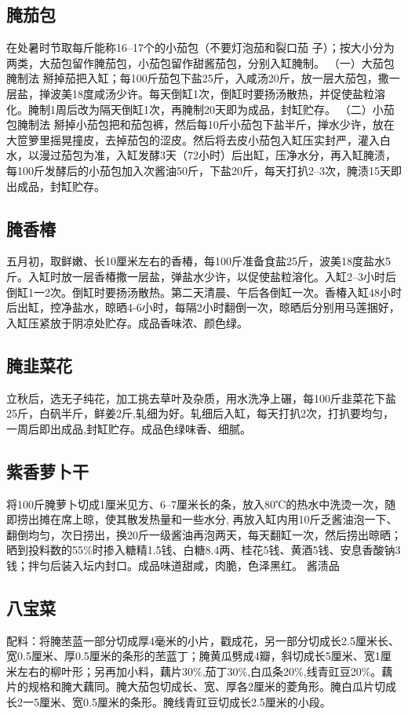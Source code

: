 \documentclass{ctexbook}
\begin{document}
\subsection{腌茄包}
在处暑时节取每斤能称16--17个的小茄包（不要灯泡茄和裂口茄
子）；按大小分为两类，大茄包留作腌茄包，小茄包留作甜酱茄包，分别入缸腌制。
（一）大茄包腌制法
掰掉茄把入缸；每100斤茄包下盐25斤，入咸汤20斤，放一层大茄包，撒一层盐，掸波美18度咸汤少许。每天倒缸1次，倒缸时要扬汤散热，并促使盐粒溶化。腌制1周后改为隔天倒缸1次，再腌制20天即为成品，封缸贮存。
（二）小茄包腌制法
掰掉小茄包把和茄包裤，然后每10斤小茄包下盐半斤，掸水少许，放在大笸箩里摇晃撞皮，去掉茄包的涩皮。然后将去皮小茄包入缸压实封严，灌入白水，以漫过茄包为准，入缸发酵3天（72小时）后出缸，压净水分，再入缸腌渍，每100斤发酵后的小茄包加入次酱油50斤，下盐20斤，每天打扒2--3次，腌渍15天即出成品，封缸贮存。
\subsection{腌香椿}
五月初，取鲜嫩、长10厘米左右的香椿，每100斤准备食盐25斤，波美18度盐水5斤。入缸时放一层香椿撒一层盐，弹盐水少许，以促使盐粒溶化。入缸2--3小时后倒缸1一2次。倒缸时要扬汤散热。第二天清晨、午后各倒缸一次。香椿入缸48小时后出缸，控净盐水，晾晒4-6小时，每隔2小时翻倒一次，晾晒后分别用马莲捆好，入缸压紧放于阴凉处贮存。成品香味浓、颜色绿。
\subsection{腌韭菜花}
立秋后，选无子纯花，加工挑去草叶及杂质，用水洗净上碾，每100斤韭菜花下盐25斤，白矾半斤，鲜姜2斤,轧细为好。轧细后入缸，每天打扒2次，打扒要均匀，一周后即出成品,封缸贮存。成品色绿味香、细腻。
\subsection{紫香萝卜干}
将100斤腌萝卜切成1厘米见方、6--7厘米长的条，放入80℃的热水中洗烫一次，随即捞出摊在席上晾，使其散发热量和一些水分,
再放入缸内用10斤乏酱油泡一下、翻倒均匀，次日捞出，换20斤一级酱油再泡两天，每天翻缸一次，然后捞出晾晒；晒到投料数的55\%时掺入糖精1.5钱、白糖8.4两、桂花5钱、黄酒5钱、安息香酸钠3钱；拌匀后装入坛内封口。成品味道甜咸，肉脆，色泽黑红。
酱渍品
\subsection{八宝菜}
配料：将腌苤蓝一部分切成厚4毫米的小片，戳成花，另一部分切成长2.5厘米长、宽0.5厘米、厚0.5厘米的条形的苤蓝丁；腌黄瓜劈成4瓣，斜切成长5厘米、宽1厘米左右的柳叶形；另再加小料，藕片30\%,茄丁30\%,白瓜条20\%,线青豇豆20\%。藕片的规格和腌大藕同。腌大茄包切成长、宽、厚各2厘米的菱角形。腌白瓜片切成长2一5厘米、宽0.5厘米的条形。腌线青豇豆切成长2.5厘米的小段。
\end{document}
